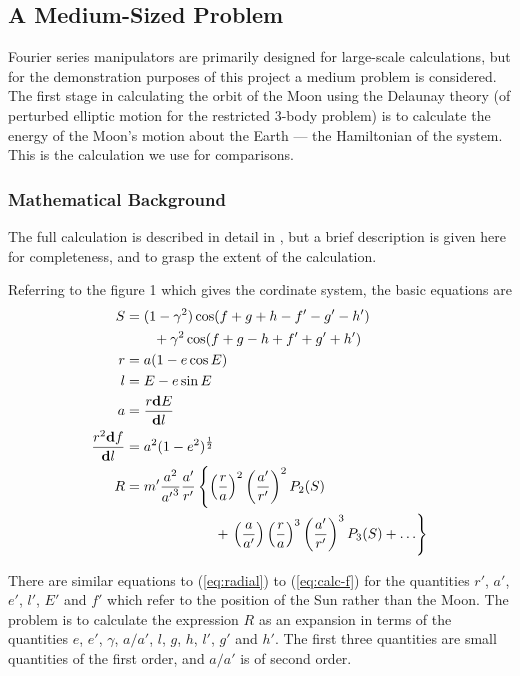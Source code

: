 \subsection{A Medium-Sized Problem}

Fourier series manipulators are primarily designed for large-scale
calculations, but for the demonstration purposes of this project a
medium problem is considered.  The first stage in calculating the
orbit of the Moon using the Delaunay theory (of perturbed elliptic
motion for the restricted 3-body problem) is to calculate the energy
of the Moon's motion about the Earth --- the Hamiltonian of the
system.   This is the calculation we use for comparisons.

\subsubsection{Mathematical Background}

The full calculation is described in detail in \cite{Brown:1896}, but a
brief description is given here for completeness, and to grasp the
extent of the calculation.

Referring to the figure 1 which gives the cordinate system, the basic
equations are
\begin{subequations}
\begin{align}
  S  & = (1-\gamma ^2)\cos(f + g +h -f' -g' -h') \notag \\
     & \qquad + \gamma ^2 \cos(f + g -h +f' +g' +h')  \label{eq:calc-S}\\
r & = a (1 - e \cos E) \label{eq:radial}\\
l & = E - e \sin E \label{eq:Kepler}\\
a & = \frac{r\mathbf{d} E}{\mathbf{d}l} \label{eq:calc-a}\\
\frac{r ^2 \mathbf{d} f}{\mathbf{d} l} & = a^2 (1 - e^2)^{\frac{1}{2}} \label{eq:calc-f}\\
  R & = m' \frac{a^2}{{a'}^3} \frac{a'}{r'}
         \left \{ \left (\frac{r}{a}\right )^2
              \left (\frac{a'}{r'}\right )^2 P_2(S) \right. \notag \\
     & \hphantom{ = m' \frac{a^2}{{a'}^3} \frac{a'}{r'} \Biggl\{ \Biggr\} }
       + \left. \left (\frac{a}{a'}\right )\left
              (\frac{r}{a}\right )^3 \left (\frac{a'}{r'}\right )^3 P_3(S)
              + \ldots \right \} \label{eq:calc-R}
\end{align}
\end{subequations}

There are similar equations to (\ref{eq:radial}) to (\ref{eq:calc-f}) for the quantities $r'$,
$a'$, $e'$, $l'$, $E'$ and $f'$ which refer to the position of the Sun
rather than the Moon.  The problem is to calculate the expression $R$
as an expansion in terms of the quantities $e$, $e'$, $\gamma$,
$a/a'$, $l$, $g$, $h$, $l'$, $g'$ and $h'$.  The first three
quantities are small quantities of the first order, and $a/a'$ is of
second order.

